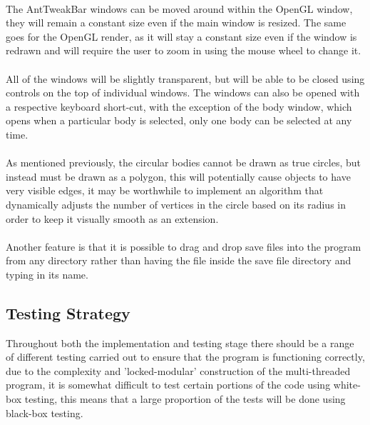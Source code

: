 \paragraph{}
The AntTweakBar windows can be moved around within the OpenGL window, they will remain a constant size even if the main window is resized. The same goes for the OpenGL render, as it will stay a constant size even if the window is redrawn and will require the user to zoom in using the mouse wheel to change it.

\paragraph{}
All of the windows will be slightly transparent, but will be able to be closed using controls on the top of individual windows. The windows can also be opened with a respective keyboard short-cut, with the exception of the body window, which opens when a particular body is selected, only one body can be selected at any time.

\paragraph{}
As mentioned previously, the circular bodies cannot be drawn as true circles, but instead must be drawn as a polygon, this will potentially cause objects to have very visible edges, it may be worthwhile to implement an algorithm that dynamically adjusts the number of vertices in the circle based on its radius in order to keep it visually smooth as an extension.

\paragraph{}
Another feature is that it is possible to drag and drop save files into the program from any directory rather than having the file inside the save file directory and typing in its name.

\pagebreak
\subsection{Testing Strategy}
Throughout both the implementation and testing stage there should be a range of different testing carried out to ensure that the program is functioning correctly, due to the complexity and 'locked-modular' construction of the multi-threaded program, it is somewhat difficult to test certain portions of the code using white-box testing, this means that a large proportion of the tests will be done using black-box testing.

